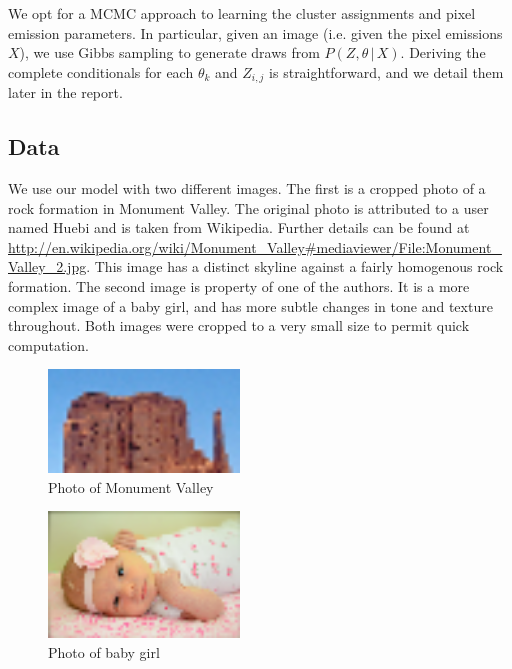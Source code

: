\documentclass[12pt]{article}
\begin{document}
We opt for a MCMC approach to learning the cluster assignments and pixel emission parameters.
In particular, given an image (i.e. given the pixel emissions $X$), we use Gibbs sampling
to generate draws from $P(Z,\theta\, |\, X)$.
Deriving the complete conditionals for each $\theta_k$ and $Z_{i,j}$ is straightforward,
and we detail them later in the report.

\subsection*{Data}
We use our model with two different images. The first is a cropped photo of a
rock formation in Monument Valley. The original photo is attributed to a user
named Huebi and is taken from Wikipedia. Further details can be found at
\url{http://en.wikipedia.org/wiki/Monument_Valley#mediaviewer/File:Monument_Valley_2.jpg}.
This image has a distinct skyline against a fairly homogenous rock formation.
The second image is property of one of the authors. It is a more complex image
of a baby girl, and has more subtle changes in tone and texture throughout.
Both images were cropped to a very small size to permit quick computation.

\begin{figure}
    \begin{center}
        \includegraphics[width=2in]{small/mv_small.png}
    \end{center}
    \caption{Photo of Monument Valley}
\end{figure}

\begin{figure}
    \begin{center}
        \includegraphics[width=2in]{small/esther_small.png}
    \end{center}
    \caption{Photo of baby girl}
\end{figure}
\end{document}
